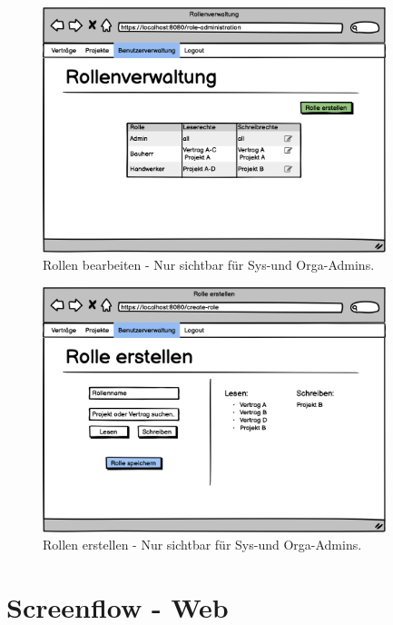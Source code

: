 \begin{figure}[h]
\centering
\includegraphics[width=10cm]{img/mockup_web/admin-roles.png}
\caption{Rollen bearbeiten - Nur sichtbar für Sys-und Orga-Admins.}
\end{figure}

\begin{figure}[h]
\centering
\includegraphics[width=10cm]{img/mockup_web/admin-create-role.png}
\caption{Rollen erstellen - Nur sichtbar für Sys-und Orga-Admins.}
\end{figure}

\clearpage

\section{Screenflow - Web}